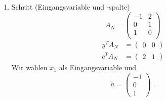 \documentclass[a4paper]{scrartcl}
\begin{document}
\begin{enumerate}[label=\bfseries\arabic*.]
\begin{enumerate}
\begin{enumerate}[1.]
\begin{enumerate}[1.]
                            \item Schritt (Eingangsvariable und -spalte)
                                \begin{equation}
                                    A_N =
                                    \begin{pmatrix}
                                        -1 & 2 \\
                                        0 & 1 \\
                                        1 & 0 \\
                                    \end{pmatrix}
                                \end{equation}
                                \begin{align}
                                    y^TA_N &=
                                    \begin{pmatrix}
                                        0 & 0
                                    \end{pmatrix} \\
                                    c^TA_N &=
                                    \begin{pmatrix}
                                        2 & 1
                                    \end{pmatrix}
                                \end{align}
                                Wir wählen $x_1$ als Eingangsvariable und
                                \begin{equation}
                                    a =
                                    \begin{pmatrix}
                                        -1 \\ 0 \\ 1
                                    \end{pmatrix}
                                    \text{ .}   
                                \end{equation}


\end{enumerate}
\end{enumerate}
\end{enumerate}
\end{enumerate}
\end{document}
